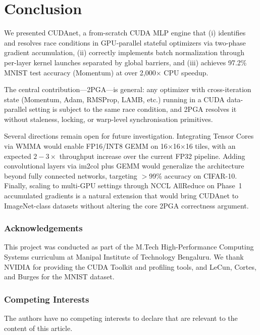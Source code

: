 \documentclass[runningheads]{llncs}
\begin{document}
\section{Conclusion}

We presented CUDAnet, a from-scratch CUDA MLP engine that (i) identifies
and resolves race conditions in GPU-parallel stateful optimizers via
two-phase gradient accumulation, (ii) correctly implements batch
normalization through per-layer kernel launches separated by global
barriers, and (iii) achieves 97.2\% MNIST test accuracy (Momentum) at
over 2{,}000$\times$ CPU speedup.

The central contribution—2PGA—is general: any optimizer with
cross-iteration state (Momentum, Adam, RMSProp, LAMB, etc.) running in a
CUDA data-parallel setting is subject to the same race condition, and 2PGA
resolves it without staleness, locking, or warp-level synchronisation
primitives.

Several directions remain open for future investigation. Integrating Tensor
Cores via WMMA would enable FP16/INT8 GEMM on 16$\times$16$\times$16
tiles, with an expected $2\!-\!3\times$ throughput increase over the
current FP32 pipeline. Adding convolutional layers via im2col plus GEMM
would generalize the architecture beyond fully connected networks, targeting
$>$99\% accuracy on CIFAR-10. Finally, scaling to multi-GPU settings
through NCCL AllReduce on Phase~1 accumulated gradients is a natural
extension that would bring CUDAnet to ImageNet-class datasets without
altering the core 2PGA correctness argument.

\subsubsection*{Acknowledgements}
This project was conducted as part of the M.Tech High-Performance
Computing Systems curriculum at Manipal Institute of Technology Bengaluru.
We thank NVIDIA for providing the CUDA Toolkit and profiling tools, and
LeCun, Cortes, and Burges for the MNIST dataset.

\subsubsection*{Competing Interests}
The authors have no competing interests to declare that are relevant to
the content of this article.
\end{document}
